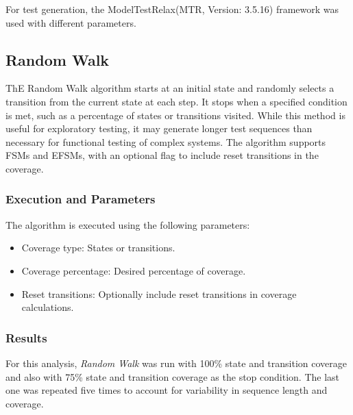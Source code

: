 \documentclass[main.tex]{subfiles}
\begin{document}
For test generation, the ModelTestRelax(MTR,  Version: 3.5.16) framework \cite{mtr} was used with different parameters.

\subsection{Random Walk}
ThE Random Walk algorithm starts at an initial state and randomly selects a transition from the current state at each step. It stops when a specified condition is met, such as a percentage of states or transitions visited. While this method is useful for exploratory testing, it may generate longer test sequences than necessary for functional testing of complex systems. The algorithm supports FSMs and EFSMs, with an optional flag to include reset transitions in the coverage.

\subsubsection*{Execution and Parameters}
The algorithm is executed using the following parameters:
\begin{itemize}
    \item Coverage type: States or transitions.
    \item Coverage percentage: Desired percentage of coverage.
    \item Reset transitions: Optionally include reset transitions in coverage calculations.
\end{itemize}

\subsubsection*{Results}
For this analysis, \textit{Random Walk} was run with 100\% state and transition coverage and also with 75\% state and transition coverage as the stop condition. The last one was repeated five times to account for variability in sequence length and coverage.
\end{document}
